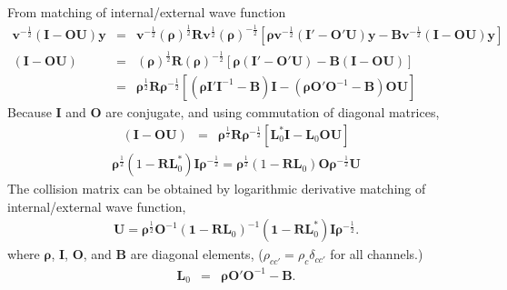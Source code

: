 \documentclass[11pt]{book}
\def\bm{\boldsymbol}
\newcommand{\bea}{\begin{eqnarray}}
\newcommand{\eea}{\end{eqnarray}}
\newcommand{\no}{\nonumber \\}
\begin{document}
From matching of internal/external
wave function
\bea 
{\bm v}^{-\frac{1}{2}} ({{\bm I}-{\bm O}{\bm U}}) {\bm y}      &=&  {\bm v}^{-\frac{1}{2}} ({\bm\rho})^{\frac{1}{2}}{\bm R}
{\bm v}^{\frac{1}{2}}({\bm \rho})^{-\frac{1}{2}}
\left[ {\bm \rho} {\bm v}^{-\frac{1}{2}} ({{\bm I}'-{\bm O}'{\bm U}}) {\bm y}-{\bm B}{\bm v}^{-\frac{1}{2}} ({{\bm I}-{\bm O}{\bm U}}) {\bm y}\right]   \no 
({{\bm I}-{\bm O}{\bm U}}) &=& ({\bm\rho})^{\frac{1}{2}}{\bm R}({\bm \rho})^{-\frac{1}{2}}
\left[ {\bm \rho} ({{\bm I}'-{\bm O}'{\bm U}})-{\bm B} ({{\bm I}-{\bm O}{\bm U}})\right] \no 
  &=& {\bm\rho}^{\frac{1}{2}}{\bm R}{\bm \rho}^{-\frac{1}{2}}
  \left[ ({\bm \rho}{\bm I}'{\bm I}^{-1}-{\bm B}){\bm I}-({\bm \rho}{\bm O}'{\bm O}^{-1}-{\bm B})
   {\bm O}{\bm U} \right]
\eea 
Because ${\bm I}$ and ${\bm O}$ are conjugate, and using commutation of diagonal matrices,  
\bea 
({{\bm I}-{\bm O}{\bm U}})&=& 
{\bm\rho}^{\frac{1}{2}}{\bm R}{\bm \rho}^{-\frac{1}{2}}
\left[ {\bm L}_0^* {\bm I}-{\bm L}_0
{\bm O}{\bm U} \right]
\eea 
\bea 
{\bm \rho}^{\frac{1}{2}}(1-{\bm R}{\bm L}_0^*){\bm I}{\bm \rho}^{-\frac{1}{2}}
={\bm \rho}^{\frac{1}{2}}(1-{\bm R}{\bm L}_0){\bm O}{\bm \rho}^{-\frac{1}{2}}{\bm U}
\eea 
The collision matrix can be obtained by logarithmic derivative matching of internal/external
wave function,
\bea 
{\bm U}={\bm\rho}^{\frac{1}{2}}{\bm O}^{-1}({\bm 1}-{\bm R}{\bm L}_0)^{-1}
        ({\bm 1}-{\bm R}{\bm L}_0^*){\bm I} {\bm \rho}^{-\frac{1}{2}}.
\eea 
where ${\bm \rho}$, ${\bm I}$, ${\bm O}$, and ${\bm B}$ are diagonal elements,
($\rho_{cc'}=\rho_c\delta_{cc'}$ for all channels.)
\bea 
{\bm L}_0&=& {\bm \rho}{\bm O}' {\bm O}^{-1}-{\bm B}.
\eea 
\end{document}
